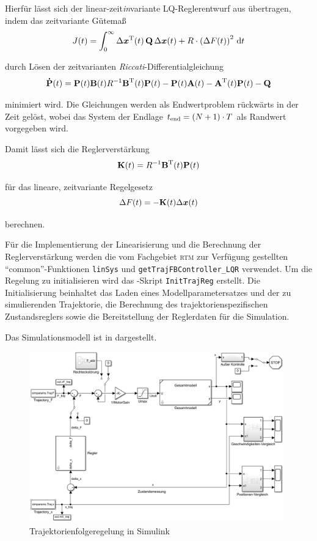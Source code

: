 Hierfür lässt sich der linear-zeit\emph{in}variante LQ-Reglerentwurf aus  übertragen, indem das zeitvariante Gütemaß 
	\[
	J(t) = \int_{0}^{\infty} \Delta \boldsymbol{x}^{\mathrm{T}}(t) \, {\boldsymbol{\mathrm{Q}}} \, \Delta \boldsymbol{x}(t) + R \cdot \left(\Delta F(t)\right)^2 \, \mathrm{d} t
\]

durch Lösen der zeitvarianten \emph{Riccati}-Differentialgleichung
	\[
	{\boldsymbol{\mathrm{\dot{P}}}}(t) = {\boldsymbol{\mathrm{P}}}(t) {\boldsymbol{\mathrm{B}}}(t) R^{-1} {\boldsymbol{\mathrm{B}}}^{\mathrm{T}}(t) {\boldsymbol{\mathrm{P}}}(t) - {\boldsymbol{\mathrm{P}}}(t) {\boldsymbol{\mathrm{A}}}(t) - {\boldsymbol{\mathrm{A}}}^{\mathrm{T}}(t) {\boldsymbol{\mathrm{P}}}(t) - {\boldsymbol{\mathrm{Q}}}
\]

minimiert wird. Die Gleichungen werden als Endwertproblem rückwärts in der Zeit gelöst, wobei das System der Endlage $t_{\mathrm{end}} = (N+1) \cdot T$ als Randwert vorgegeben wird. 

Damit lässt sich die Reglerverstärkung 
	\[
	{\boldsymbol{\mathrm{K}}}(t) = R^{-1} {\boldsymbol{\mathrm{B}}}^{\mathrm{T}}(t) {\boldsymbol{\mathrm{P}}}(t)
\]

für das lineare, zeitvariante Regelgesetz
	\[
	\Delta F(t) = -{\boldsymbol{\mathrm{K}}}(t) \Delta \boldsymbol{x}(t)
\]

berechnen.

Für die Implementierung der Linearisierung und die Berechnung der Reglerverstärkung werden die vom Fachgebiet \textsc{rtm} zur Verfügung gestellten "`common"'-Funktionen \texttt{linSys} und \texttt{getTrajFBController\_LQR} verwendet. Um die Regelung zu initialisieren wird das \Matlab-Skript \texttt{InitTrajReg} erstellt. Die Initialisierung beinhaltet das Laden eines Modellparametersatzes und der zu simulierenden Trajektorie, die Berechnung des trajektorienspezifischen Zustandsreglers sowie die Bereitstellung der Reglerdaten für die Simulation. 

Das Simulationsmodell ist in  dargestellt.

\begin{figure}
	\centering
		\includegraphics[width=0.98\textwidth]{Bilder/Simulink/TFR.PNG}
	\caption{Trajektorienfolgeregelung in Simulink}
	\label{fig:TFR_Simulink}
\end{figure}

